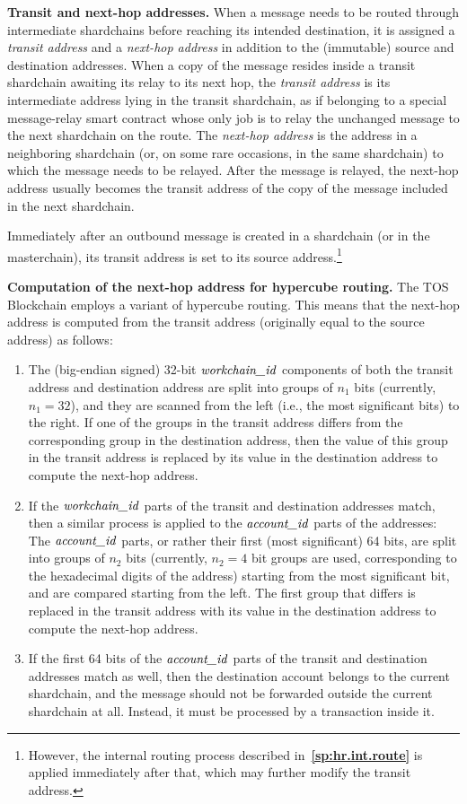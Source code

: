 \documentclass[12pt,oneside]{article}
\def\makepoint#1{\medbreak\noindent{\bf #1.\ }}
\def\nxsubpoint{\refstepcounter{subsubsection}%
  \smallbreak\makepoint{\thesubsubsection}}
\def\refpoint#1{{\rm\textbf{\ref{#1}}}}
\let\ptref=\refpoint
\def\emb#1{\textbf{#1.}}
\let\vr=\textit
\def\workchainid{\vr{workchain\_id\/}}
\def\accountid{\vr{account\_id\/}}
\begin{document}
\nxsubpoint\emb{Transit and next-hop addresses}
When a message needs to be routed through intermediate shardchains before reaching its intended destination, it is assigned a {\em transit address\/} and a {\em next-hop address\/} in addition to the (immutable) source and destination addresses. When a copy of the message resides inside a transit shardchain awaiting its relay to its next hop, the {\em transit address\/} is its intermediate address lying in the transit shardchain, as if belonging to a special message-relay smart contract whose only job is to relay the unchanged message to the next shardchain on the route. The {\em next-hop address\/} is the address in a neighboring shardchain (or, on some rare occasions, in the same shardchain) to which the message needs to be relayed. After the message is relayed, the next-hop address usually becomes the transit address of the copy of the message included in the next shardchain.

Immediately after an outbound message is created in a shardchain (or in the masterchain), its transit address is set to its source address.\footnote{However, the internal routing process described in~\ptref{sp:hr.int.route} is applied immediately after that, which may further modify the transit address.}

\nxsubpoint\label{sp:hr.next.hop}\emb{Computation of the next-hop address for hypercube routing}
The TOS Blockchain employs a variant of hypercube routing. This means that the next-hop address is computed from the transit address (originally equal to the source address) as follows:

\begin{enumerate}
\item The (big-endian signed) 32-bit $\workchainid$ components of both the transit address and destination address are split into groups of $n_1$ bits (currently, $n_1=32$), and they are scanned from the left (i.e., the most significant bits) to the right. If one of the groups in the transit address differs from the corresponding group in the destination address, then the value of this group in the transit address is replaced by its value in the destination address to compute the next-hop address.
\item If the $\workchainid$ parts of the transit and destination addresses match, then a similar process is applied to the $\accountid$ parts of the addresses: The $\accountid$ parts, or rather their first (most significant) 64 bits, are split into groups of $n_2$ bits (currently, $n_2=4$ bit groups are used, corresponding to the hexadecimal digits of the address) starting from the most significant bit, and are compared starting from the left. The first group that differs is replaced in the transit address with its value in the destination address to compute the next-hop address.
\item If the first 64 bits of the $\accountid$ parts of the transit and destination addresses match as well, then the destination account belongs to the current shardchain, and the message should not be forwarded outside the current shardchain at all. Instead, it must be processed by a transaction inside it.
\end{enumerate}
\end{document}
